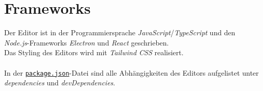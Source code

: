 \section{Frameworks}\label{sec:frameworks}

Der Editor ist in der Programmiersprache \emph{JavaScript}/\emph{TypeScript} und den \emph{Node.js}-Frameworks \emph{Electron} und \emph{React} geschrieben.\\
Das Styling des Editors wird mit \emph{Tailwind CSS} realisiert.\\\\
In der \href{https://gitlab.uni-ulm.de/softwaregrundprojekt/2022-2023/messe/editor/messe-editor-team-11/-/blob/main/package.json}{\texttt{package.json}}-Datei sind alle Abhängigkeiten des Editors aufgelistet unter \emph{dependencies} und \emph{devDependencies}.

